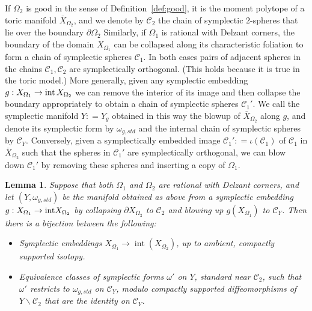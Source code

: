 \documentclass[11pt, reqno]{amsart}
\newtheorem{lemma}[thm]{Lemma}
\theoremstyle{remark}
\numberwithin{equation}{subsection}
\numberwithin{figure}{section}
\theoremstyle{customremark}
\newcommand{\intt}{{\rm int}}
\newcommand{\Cc}{{\mathcal C}}
\newcommand{\ov}{\overline}
\newcommand{\Om}{{\Omega}}
\newcommand{\om}{{\omega}}
\newcommand{\io}{{\iota}}
\newcommand{\less} {{\smallsetminus}}
\newcommand{\p}{{\partial}}
\newcommand{\op}[1]{{\operatorname{#1}}}
\begin{document}
If $\Om_2$ is good in the sense of Definition~\ref{def:good}, it is the moment polytope of a toric manifold $\ov X_{\Om_2}$, and we denote by $\Cc_2$ the chain of  symplectic $2$-spheres that lie over the boundary $\p \Om_2$  Similarly, if $\Om_1$ is rational with Delzant corners,  the boundary of the  domain $X_{\Om_1}$ can be collapsed along its characteristic foliation to form a chain of symplectic  spheres $\Cc_1$.  In both cases pairs of adjacent spheres in the chains $\Cc_1,\Cc_2$ are symplectically orthogonal. (This holds because it is true in the toric model.)
More generally, given any symplectic embedding $g:X_{\Om_1}\to \intt\, {X}_{\Om_2}$ we can remove the interior of its image and then collapse the boundary appropriately to obtain a chain of symplectic spheres $\Cc_1'$.  
We call the symplectic  manifold $Y: = Y_g$ obtained in this way the blowup of $\ov X_{\Om_2}$ along $g$, and denote its symplectic form by $\om_{g,std}$ and the internal chain of symplectic spheres by $\Cc_{Y}$.   Conversely, given a symplectically  embedded image $\Cc_1': = \io(\Cc_1)$ of $\Cc_1$ in $\ov X_{\Om_2}$ such that the spheres in $\Cc_1'$ are symplectically orthogonal, 
we can blow down $\Cc_1'$ by removing these spheres and inserting a copy of $\Om_1$. 

\begin{lemma}
\label{lem:blowupdown} Suppose that both $\Om_1$ and $\Om_2$ are rational with Delzant corners, and let $(Y,\om_{g,std})$ be the manifold
obtained as above from a symplectic embedding $g: X_{\Om_1} \to \intt X_{\Om_2}$ by collapsing $\p X_{\Om_2}$ to $\Cc_2$  and blowing up $g(X_{\Om_1})$ to $\Cc_Y$.
Then there is a bijection between the following:
\begin{itemize}
\item [{\rm (i)}] Symplectic embeddings $X_{\Omega_1} \to \op{int}(X_{\Omega_2})$, up to ambient, compactly supported  isotopy.
\item [{\rm (ii)}] Equivalence classes of symplectic forms $\omega'$ on $Y$, standard near $\Cc_2$, such that $\omega'$ restricts to $\om_{g,std}$ on $\Cc_Y$, modulo compactly supported diffeomorphisms  of $Y\less \Cc_2$ that are the identity on $\Cc_{Y} $.
\end{itemize}
\end{lemma}   
\end{document}
